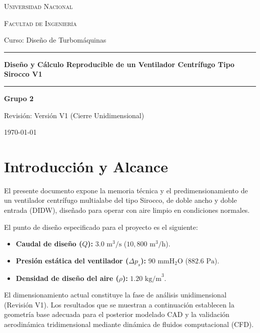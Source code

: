 \documentclass[12pt,a4paper]{article}
\newcommand{\hrules}{\rule{\linewidth}{0.5mm}}
\begin{document}
\begin{titlepage}
    \centering
    \vspace*{1cm}
    {\scshape\LARGE Universidad Nacional\par}
    \vspace{1.5cm}
    {\scshape\Large Facultad de Ingeniería\par}
    \vspace{0.5cm}
    {\large Curso: Diseño de Turbomáquinas\par}
    \vspace{2cm}
    \hrules
    \vspace{0.4cm}
    {\huge\bfseries Diseño y Cálculo Reproducible de un Ventilador Centrífugo Tipo Sirocco V1\par}
    \vspace{0.4cm}
    \hrules
    \vspace{1.5cm}
    {\large\bfseries Grupo 2\par}
    \vspace{0.5cm}
    {\large Revisión: Versión V1 (Cierre Unidimensional)\par}
    \vfill
    {\large \today\par}
\end{titlepage}

\tableofcontents
\newpage

\section{Introducción y Alcance}
El presente documento expone la memoria técnica y el predimensionamiento de un ventilador centrífugo multialabe del tipo Sirocco, de doble ancho y doble entrada (DIDW), diseñado para operar con aire limpio en condiciones normales.

El punto de diseño especificado para el proyecto es el siguiente:
\begin{itemize}
    \item \textbf{Caudal de diseño ($Q$):} $3.0\text{ m}^3/\text{s}$ ($10,800\text{ m}^3/\text{h}$).
    \item \textbf{Presión estática del ventilador ($\Delta p_s$):} $90\text{ mmH}_2\text{O}$ ($882.6\text{ Pa}$).
    \item \textbf{Densidad de diseño del aire ($\rho$):} $1.20\text{ kg/m}^3$.
\end{itemize}

El dimensionamiento actual constituye la fase de análisis unidimensional (Revisión V1). Los resultados que se muestran a continuación establecen la geometría base adecuada para el posterior modelado CAD y la validación aerodinámica tridimensional mediante dinámica de fluidos computacional (CFD).
\end{document}
